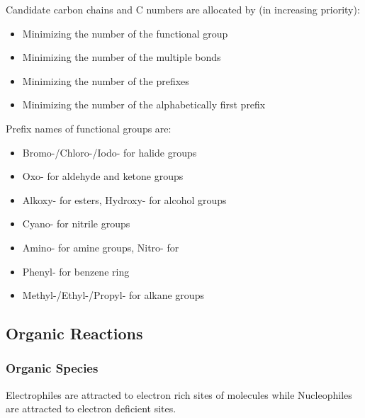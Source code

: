 \documentclass[../main]{subfiles}
\begin{document}
	Candidate carbon chains and C numbers are allocated by (in increasing priority):
	\begin{itemize}
		\item Minimizing the number of the functional group
		\item Minimizing the number of the multiple bonds
		\item Minimizing the number of the prefixes
		\item Minimizing the number of the alphabetically first prefix
	\end{itemize}

	Prefix names of functional groups are:
	\begin{itemize}
		\item Bromo-/Chloro-/Iodo- for halide groups
		\item Oxo- for aldehyde and ketone groups
		\item Alkoxy- for esters, Hydroxy- for alcohol groups
		\item Cyano- for nitrile groups
		\item Amino- for amine groups, Nitro- for 
		\item Phenyl- for benzene ring
		\item Methyl-/Ethyl-/Propyl- for alkane groups
	\end{itemize}

	\subsection{Organic Reactions}

	\subsubsection{Organic Species}



	Electrophiles are attracted to electron rich sites of molecules while Nucleophiles are attracted to electron deficient sites.
\end{document}
